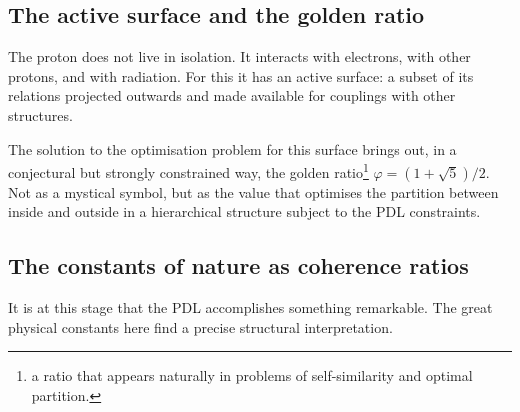 \documentclass[11pt, a4paper, openright]{book}
\begin{document}
\subsection*{The active surface and the golden ratio}

The proton does not live in isolation. It interacts with electrons, with other protons, and with radiation. For this it has an active surface: a subset of its relations projected outwards and made available for couplings with other structures.

\medskip

The solution to the optimisation problem for this surface brings out, in a conjectural but strongly constrained way, the golden ratio\footnote{a ratio that appears naturally in problems of self-similarity and optimal partition.} $\varphi = (1+\sqrt{5})/2$. Not as a mystical symbol, but as the value that optimises the partition between inside and outside in a hierarchical structure subject to the PDL constraints.

\subsection*{The constants of nature as coherence ratios}

It is at this stage that the PDL accomplishes something remarkable. The great physical constants here find a precise structural interpretation.

\medskip
\end{document}
